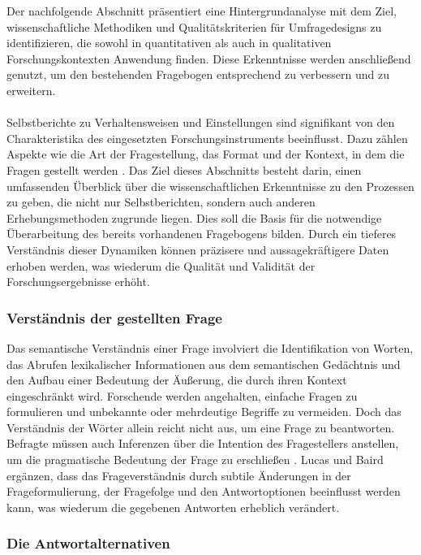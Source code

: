 \documentclass[german,report]{i1thesis}
\begin{document}
Der nachfolgende Abschnitt präsentiert eine Hintergrundanalyse mit dem Ziel, wissenschaftliche Methodiken und Qualitätskriterien für Umfragedesigns zu identifizieren, die sowohl in quantitativen als auch in qualitativen Forschungskontexten Anwendung finden. Diese Erkenntnisse werden anschließend genutzt, um den bestehenden Fragebogen entsprechend zu verbessern und zu erweitern.\\
\\
Selbstberichte zu Verhaltensweisen und Einstellungen sind signifikant von den Charakteristika des eingesetzten Forschungsinstruments beeinflusst. Dazu zählen Aspekte wie die Art der Fragestellung, das Format und der Kontext, in dem die Fragen gestellt werden \cite{Schwarz1999}. Das Ziel dieses Abschnitts besteht darin, einen umfassenden Überblick über die wissenschaftlichen Erkenntnisse zu den Prozessen zu geben, die nicht nur Selbstberichten, sondern auch anderen Erhebungsmethoden zugrunde liegen. Dies soll die Basis für die notwendige Überarbeitung des bereits vorhandenen Fragebogens bilden. Durch ein tieferes Verständnis dieser Dynamiken können präzisere und aussagekräftigere Daten erhoben werden, was wiederum die Qualität und Validität der Forschungsergebnisse erhöht.

\subsubsection{Verständnis der gestellten Frage}

Das semantische Verständnis einer Frage involviert die Identifikation von Worten, das Abrufen lexikalischer Informationen aus dem semantischen Gedächtnis und den Aufbau einer Bedeutung der Äußerung, die durch ihren Kontext eingeschränkt wird. Forschende werden angehalten, einfache Fragen zu formulieren und unbekannte oder mehrdeutige Begriffe zu vermeiden. Doch das Verständnis der Wörter allein reicht nicht aus, um eine Frage zu beantworten. Befragte müssen auch Inferenzen über die Intention des Fragestellers anstellen, um die pragmatische Bedeutung der Frage zu erschließen \cite{Schwarz1999}. Lucas und Baird \cite{LucasBaird2006} ergänzen, dass das Frageverständnis durch subtile Änderungen in der Frageformulierung, der Fragefolge und den Antwortoptionen beeinflusst werden kann, was wiederum die gegebenen Antworten erheblich verändert.

\subsubsection{Die Antwortalternativen}
\end{document}
